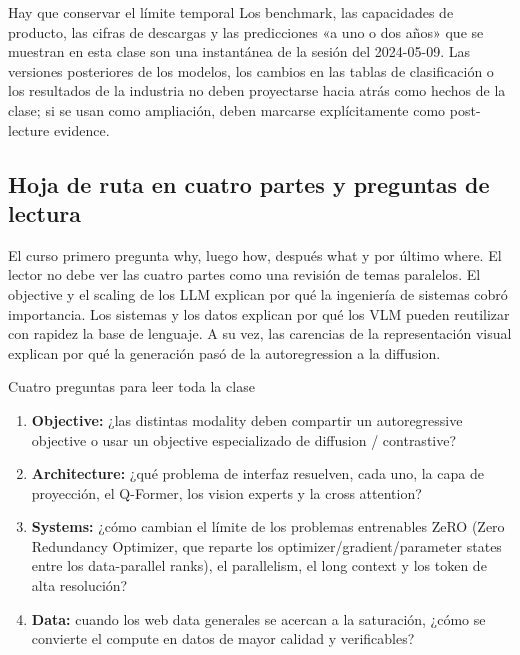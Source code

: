 \begin{warningbox}{Hay que conservar el límite temporal}
Los benchmark, las capacidades de producto, las cifras de descargas y las predicciones «a uno o dos años» que se muestran en esta clase son una instantánea de la sesión del 2024-05-09. Las versiones posteriores de los modelos, los cambios en las tablas de clasificación o los resultados de la industria no deben proyectarse hacia atrás como hechos de la clase; si se usan como ampliación, deben marcarse explícitamente como post-lecture evidence.
\end{warningbox}

\subsection{Hoja de ruta en cuatro partes y preguntas de lectura}

El curso primero pregunta why, luego how, después what y por último where. El lector no debe ver las cuatro partes como una revisión de temas paralelos. El objective y el scaling de los LLM explican por qué la ingeniería de sistemas cobró importancia. Los sistemas y los datos explican por qué los VLM pueden reutilizar con rapidez la base de lenguaje. A su vez, las carencias de la representación visual explican por qué la generación pasó de la autoregression a la diffusion.


\begin{importantbox}{Cuatro preguntas para leer toda la clase}
\begin{enumerate}
  \item \textbf{Objective:} ¿las distintas modality deben compartir un autoregressive objective o usar un objective especializado de diffusion / contrastive?
  \item \textbf{Architecture:} ¿qué problema de interfaz resuelven, cada uno, la capa de proyección, el Q-Former, los vision experts y la cross attention?
  \item \textbf{Systems:} ¿cómo cambian el límite de los problemas entrenables ZeRO (Zero Redundancy Optimizer, que reparte los optimizer/gradient/parameter states entre los data-parallel ranks), el parallelism, el long context y los token de alta resolución?
  \item \textbf{Data:} cuando los web data generales se acercan a la saturación, ¿cómo se convierte el compute en datos de mayor calidad y verificables?
\end{enumerate}
\end{importantbox}

